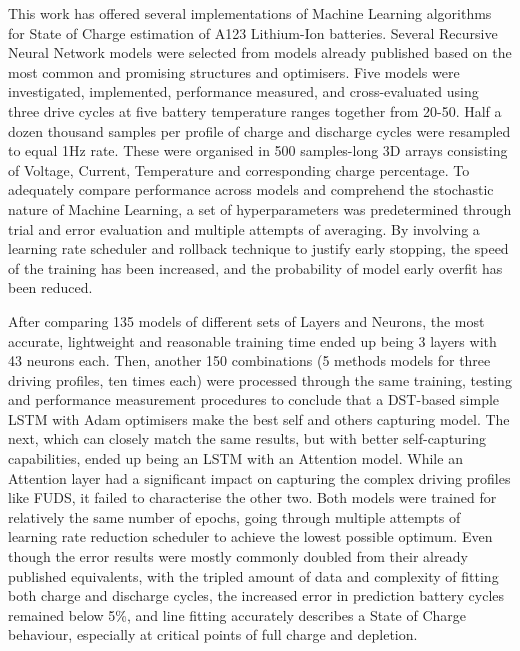 
%
%
This work has offered several implementations of Machine Learning algorithms for State of Charge estimation of A123 Lithium-Ion batteries.
Several Recursive Neural Network models were selected from models already published based on the most common and promising structures and optimisers.
Five models were investigated, implemented, performance measured, and cross-evaluated using three drive cycles at five battery temperature ranges together from 20-50\textdegree{}.
Half a dozen thousand samples per profile of charge and discharge cycles were resampled to equal 1Hz rate.
These were organised in 500 samples-long 3D arrays consisting of Voltage, Current, Temperature and corresponding charge percentage.
To adequately compare performance across models and comprehend the stochastic nature of Machine Learning, a set of hyperparameters was predetermined through trial and error evaluation and multiple attempts of averaging.
By involving a learning rate scheduler and rollback technique to justify early stopping, the speed of the training has been increased, and the probability of model early overfit has been reduced.

%
%
After comparing 135 models of different sets of Layers and Neurons, the most accurate, lightweight and reasonable training time ended up being 3 layers with 43 neurons each.
Then, another 150 combinations (5 methods models for three driving profiles, ten times each) were processed through the same training, testing and performance measurement procedures to conclude that a DST-based simple LSTM with Adam optimisers make the best self and others capturing model.
The next, which can closely match the same results, but with better self-capturing capabilities, ended up being an LSTM with an Attention model.
While an Attention layer had a significant impact on capturing the complex driving profiles like FUDS, it failed to characterise the other two.
Both models were trained for relatively the same number of epochs, going through multiple attempts of learning rate reduction scheduler to achieve the lowest possible optimum.
Even though the error results were mostly commonly doubled from their already published equivalents, with the tripled amount of data and complexity of fitting both charge and discharge cycles, the increased error in prediction battery cycles remained below 5\%, and line fitting accurately describes a State of Charge behaviour, especially at critical points of full charge and depletion.


